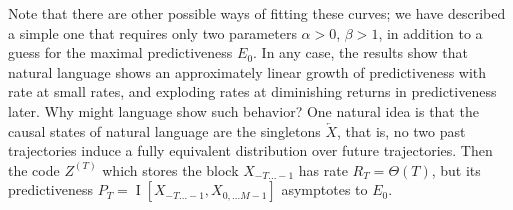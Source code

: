 \documentclass[entropy,article,submit,moreauthors,pdftex,10pt,a4paper]{Definitions/mdpi}
\newif \ifcomment
\newcommand\rljf[1]{\ifcomment{{\color{blue}(#1)}}\else{}\fi}
\newcommand{\past}{\overleftarrow{X}}
\begin{document}
Note that there are other possible ways of fitting these curves; we have described a simple one that requires only two parameters $\alpha >0$, $\beta > 1$, in addition to a guess for the maximal predictiveness $E_0$.
In any case, the results show that natural language shows an approximately linear growth of predictiveness with rate at small rates, and exploding rates at diminishing returns in predictiveness later.
Why might language show such behavior?
One natural idea is that the causal states of natural language are the singletons $\past$, that is, no two past trajectories induce a fully equivalent distribution over future trajectories.
Then the code $Z^{(T)}$ which stores the block $X_{-T...-1}$ has rate $R_T = \Theta(T)$, but its predictiveness $P_T =	\operatorname{I}[X_{-T...-1}, X_{0,...M-1}]$ asymptotes to $E_0$.

\end{document}
